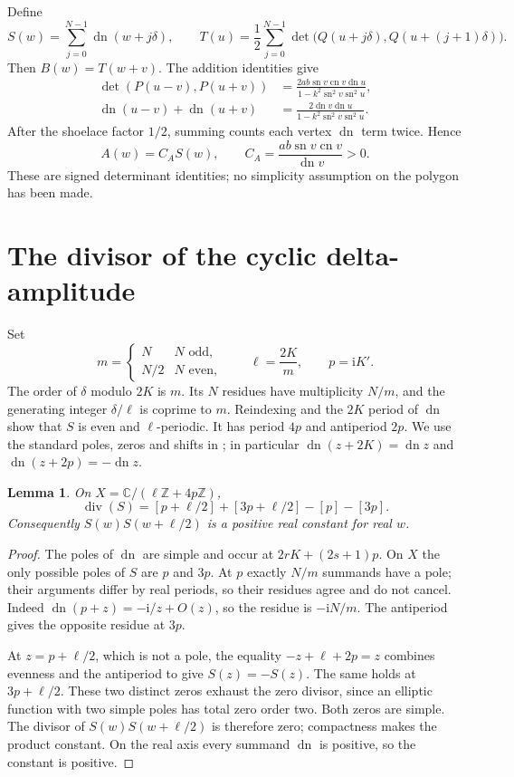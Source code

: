 \documentclass[11pt]{article}
\newtheorem{lemma}{Lemma}
\newcommand{\sn}{\operatorname{sn}}
\newcommand{\cn}{\operatorname{cn}}
\newcommand{\dn}{\operatorname{dn}}
\newcommand{\ii}{\mathrm i}
\begin{document}
Define
\begin{equation}\label{traces}
 S(w)=\sum_{j=0}^{N-1}\dn(w+j\delta),\qquad
 T(u)=\frac12\sum_{j=0}^{N-1}
           \det\bigl(Q(u+j\delta),Q(u+(j+1)\delta)\bigr).
\end{equation}
Then $B(w)=T(w+v)$. The addition identities give
\begin{align*}
 \det(P(u-v),P(u+v))
  &=\frac{2ab\sn v\cn v\dn u}{1-k^2\sn^2v\sn^2u},\\
 \dn(u-v)+\dn(u+v)
  &=\frac{2\dn v\dn u}{1-k^2\sn^2v\sn^2u}.
\end{align*}
After the shoelace factor $1/2$, summing counts each vertex $\dn$
term twice. Hence
\begin{equation}\label{A}
 A(w)=C_A S(w),\qquad C_A=\frac{ab\sn v\cn v}{\dn v}>0.
\end{equation}
These are signed determinant identities; no simplicity assumption on the
polygon has been made.

\section{The divisor of the cyclic delta-amplitude}
Set
\begin{equation}\label{reduction}
 m=\begin{cases}N&N\text{ odd},\\N/2&N\text{ even},\end{cases}
 \qquad \ell=\frac{2K}{m},\qquad p=\ii K'.
\end{equation}
The order of $\delta$ modulo $2K$ is $m$. Its $N$ residues have
multiplicity $N/m$, and the generating integer $\delta/\ell$ is
coprime to $m$. Reindexing and the $2K$ period of $\dn$ show that
$S$ is even and $\ell$-periodic. It has period $4p$ and antiperiod $2p$.
We use the standard poles, zeros and shifts in \cite[\S22.4]{DLMF};
in particular $\dn(z+2K)=\dn z$ and $\dn(z+2p)=-\dn z$.

\begin{lemma}\label{Slemma}
On $X=\mathbb C/(\ell\mathbb Z+4p\mathbb Z)$,
\[
 \operatorname{div}(S)
 =[p+\ell/2]+[3p+\ell/2]-[p]-[3p].
\]
Consequently $S(w)S(w+\ell/2)$ is a positive real constant for real $w$.
\end{lemma}
\begin{proof}
The poles of $\dn$ are simple and occur at
$2rK+(2s+1)p$. On $X$ the only possible poles of $S$ are $p$ and
$3p$. At $p$ exactly $N/m$ summands have a pole; their arguments
differ by real periods, so their residues agree and do not cancel.
Indeed $\dn(p+z)=-\ii/z+O(z)$, so the residue is $-\ii N/m$.
The antiperiod gives the opposite residue at $3p$.

At $z=p+\ell/2$, which is not a pole, the equality
$-z+\ell+2p=z$ combines evenness and the antiperiod to give
$S(z)=-S(z)$. The same holds at $3p+\ell/2$. These two distinct
zeros exhaust the zero divisor, since an elliptic function with two
simple poles has total zero order two. Both zeros are simple.
The divisor of $S(w)S(w+\ell/2)$ is therefore zero; compactness
makes the product constant. On the real axis every summand $\dn$ is
positive, so the constant is positive.
\end{proof}
\end{document}
